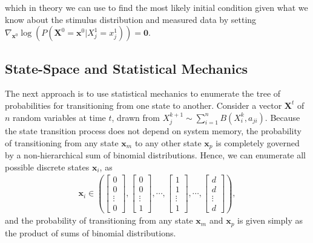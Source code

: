\documentclass[superscriptaddress]{revtex4-1}
\begin{document}
which in theory we can use to find the most likely initial condition given what we know about the stimulus distribution and measured data by setting $\nabla_{\bm{x}^0} \log(P(\bm{X}^0 = \bm{x}^0 | X_j^1 = x_j^1)) = \bm{0}$. 




\subsection{State-Space and Statistical Mechanics}
The next approach is to use statistical mechanics to enumerate the tree of probabilities for transitioning from one state to another. Consider a vector $\bm{X}^t$ of $n$ random variables at time $t$, drawn from $X_j^{k+1} \sim \sum_{i=1}^n B(X_i^k, a_{ji})$. Because the state transition process does not depend on system memory, the probability of transitioning from any state $\bm{x}_m$ to any other state $\bm{x}_p$ is completely governed by a non-hierarchical sum of binomial distributions. Hence, we can enumerate all possible discrete states $\bm{x}_i$, as
\begin{align*}
\bm{x}_i \in 
\left( 
\begin{bmatrix}
0 \\ 0 \\ \vdots \\ 0
\end{bmatrix},
\begin{bmatrix}
0 \\ 0 \\ \vdots \\ 1
\end{bmatrix},
\dotsm,
\begin{bmatrix}
1 \\ 1 \\ \vdots \\ 1
\end{bmatrix},
\dotsm,
\begin{bmatrix}
d \\ d \\ \vdots \\ d
\end{bmatrix}
\right),
\end{align*}
and the probability of transitioning from any state $\bm{x}_m$ and $\bm{x}_p$ is given simply as the product of sums of binomial distributions.


	
\end{document}

